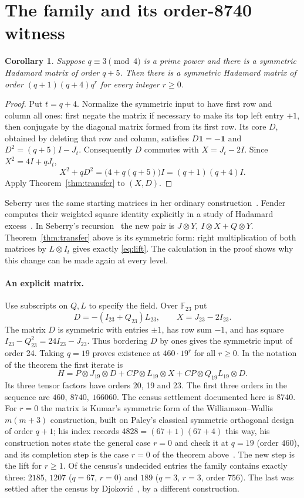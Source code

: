 \documentclass[11pt,letterpaper]{article}
\newtheorem{corollary}[theorem]{Corollary}
\newcommand{\F}{\mathbb F}
\newcommand{\one}{\mathbf 1}
\begin{document}
\newpage
\section{The family and its order-8740 witness}\label{sec:witness}
\begin{corollary}
Suppose \(q\equiv3\pmod4\) is a prime power and there is a symmetric Hadamard matrix of order \(q+5\). Then there is a symmetric Hadamard matrix of order \((q+1)(q+4)q^r\) for every integer \(r\geq0\).
\end{corollary}
\begin{proof}
Put \(t=q+4\). Normalize the symmetric input to have first row and column all ones: first negate the matrix if necessary to make its top left entry \(+1\), then conjugate by the diagonal matrix formed from its first row. Its core \(D\), obtained by deleting that row and column, satisfies \(D\one=-\one\) and \(D^2=(q+5)I-J_t\). Consequently \(D\) commutes with \(X=J_t-2I\). Since \(X^2=4I+qJ_t\),
\[
 X^2+qD^2=\bigl(4+q(q+5)\bigr)I=(q+1)(q+4)I.
\]
Apply Theorem~\ref{thm:transfer} to \((X,D)\).
\end{proof}

Seberry uses the same starting matrices in her ordinary construction~\cite{seberry}. Fender computes their weighted square identity explicitly in a study of Hadamard excess~\cite[Proposition~3.3.1]{fender}. In Seberry's recursion~\cite[Theorem~1]{seberry} the new pair is \(J\otimes Y,\ I\otimes X+Q\otimes Y\). Theorem~\ref{thm:transfer} above is its symmetric form: right multiplication of both matrices by \(L\otimes I_t\) gives exactly \eqref{eq:lift}. The calculation in the proof shows why this change can be made again at every level.

\paragraph{An explicit matrix.}
Use subscripts on \(Q,L\) to specify the field. Over \(\F_{23}\) put
\[
 D=-(I_{23}+Q_{23})L_{23},\qquad X=J_{23}-2I_{23}.
\]
The matrix \(D\) is symmetric with entries \(\pm1\), has row sum \(-1\), and has square \(I_{23}-Q_{23}^2=24I_{23}-J_{23}\). Thus bordering \(D\) by ones gives the symmetric input of order 24. Taking \(q=19\) proves existence at \(460\cdot19^r\) for all \(r\geq0\). In the notation of the theorem the first iterate is
\[
 H=P\otimes J_{19}\otimes D
   +CP\otimes L_{19}\otimes X
   +CP\otimes Q_{19}L_{19}\otimes D .
\]
Its three tensor factors have orders 20, 19 and 23. The first three orders in the sequence are \(460,\ 8740,\ 166060\). The census settlement documented here is 8740. For $r=0$ the matrix is Kumar's symmetric form of the Williamson--Wallis $m(m+3)$ construction, built on Paley's classical symmetric orthogonal design of order $q+1$; his index records $4828=(67+1)(67+4)$ this way, his construction notes state the general case $r=0$ and check it at $q=19$ (order $460$), and its completion step is the case $r=0$ of the theorem above~\cite{kumar}. The new step is the lift for $r\ge1$. Of the census's undecided entries the family contains exactly three: $2185$, $1207$ ($q=67$, $r=0$) and $189$ ($q=3$, $r=3$, order $756$). The last was settled after the census by Djokovi\'c~\cite{d25}, by a different construction.
\end{document}
